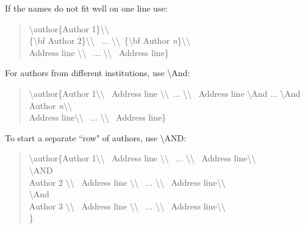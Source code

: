 \documentclass[letterpaper]{article}
\begin{document}
\noindent If the names do not fit well on one line use:

\begin{quote}
\begin{small}
\textbackslash author\{Author 1\}\textbackslash \textbackslash \\ \{\textbackslash bf Author 2\}\textbackslash \textbackslash ~ 
... \textbackslash \textbackslash ~\{\textbackslash bf Author \textit{n}\}\textbackslash \textbackslash \\
Address line \textbackslash \textbackslash ~ ... \textbackslash \textbackslash ~ Address line\}
\end{small}
\end{quote}

\noindent For authors from different institutions, use \textbackslash And:

\begin{quote}
\begin{small}
\textbackslash author\{Author 1\textbackslash \textbackslash ~ Address line \textbackslash \textbackslash ~...  \textbackslash \textbackslash ~ Address line
\textbackslash And  ...  
\textbackslash And
Author \textit{n}\textbackslash \textbackslash \\ Address line\textbackslash \textbackslash ~
... \textbackslash \textbackslash ~
Address line\}
\end{small}
\end{quote}

\noindent To start a separate ``row" of authors, use \textbackslash AND:
\begin{quote}
\begin{small}
\textbackslash author\{Author 1\textbackslash\textbackslash ~ Address line \textbackslash\textbackslash ~
...  \textbackslash \textbackslash ~ Address line\textbackslash\textbackslash \\
\textbackslash AND\\
Author 2 \textbackslash\textbackslash ~ Address line \textbackslash\textbackslash ~
...  \textbackslash \textbackslash ~ Address line\textbackslash\textbackslash \\
\textbackslash And\\
Author 3 \textbackslash\textbackslash ~ Address line \textbackslash\textbackslash ~
...  \textbackslash \textbackslash ~ Address line\textbackslash\textbackslash \\\}
\end{small}
\end{quote}
\end{document}
